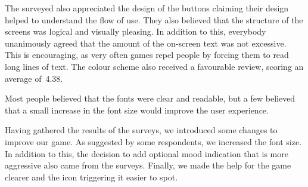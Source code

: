 The surveyed also appreciated the design of the buttons claiming their design helped to understand the flow of use.
They also believed that the structure of the screens was logical and visually pleasing. In addition to this, everybody unanimously agreed that the amount of the on-screen text was not excessive. This is encouraging, as very often games repel people by forcing them to read long lines of text. The colour scheme also received a favourable review, scoring an average of~4.38.

Most people believed that the fonts were clear and readable, but a few believed that a small increase in the font size would improve the user experience. 

Having gathered the results of the surveys, we introduced some changes to improve our game. As suggested by some respondents, we increased the font size. In addition to this, the decision to add optional mood indication that is more aggressive also came from the surveys. Finally, we made the help for the game clearer and the icon triggering it easier to spot.
